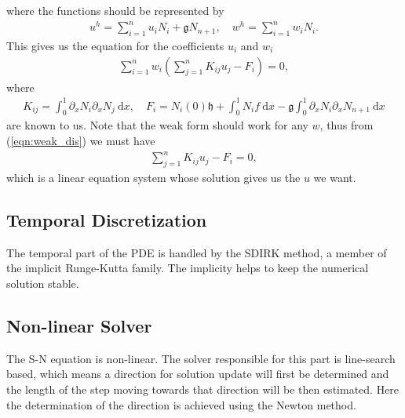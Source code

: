 where the functions should be represented by
\begin{align}
    u^h=\sum_{i=1}^nu_iN_i+\mathfrak{g}N_{n+1},\quad
    w^h=\sum_{i=1}^nw_iN_i.
\end{align}
This gives us the equation for the coefficients $u_i$ and $w_i$
\begin{align}
    \sum_{i=1}^n w_i \left(\sum_{j=1}^n K_{ij} u_{j} - F_i\right)=0,\label{eqn:weak_dis}
\end{align}
where
\begin{align}
    K_{ij}=\int_0^1\!\partial_xN_i\partial_xN_j~\mathrm{d}x,\quad
    F_i=N_i(0)\mathfrak{h}+\int_0^1\!N_if~\mathrm{d}x-\mathfrak{g}\int_0^1\!\partial_xN_i\partial_xN_{n+1}~\mathrm{d}x
\end{align}
are known to us. Note that the weak form should work for any $w$, thus from (\ref{eqn:weak_dis}) we must have
\begin{align}
    \sum_{j=1}^n K_{ij} u_{j} - F_i=0, 
\end{align}
which is a linear equation system whose solution gives us the $u$ we want. 


\subsection{Temporal Discretization}
The temporal part of the PDE is handled by the SDIRK method, a member of the implicit Runge-Kutta family. The implicity helps to keep the numerical solution stable. 

\subsection{Non-linear Solver}
The S-N equation is non-linear. The solver responsible for this part is line-search based, which means a direction for solution update will first be determined and the length of the step moving towards that direction will be then estimated. Here the determination of the direction is achieved using the Newton method. 